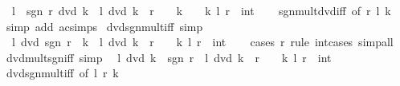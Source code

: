 \begin{isabellebody}
\ \ {\isachardoublequoteopen}l\ {\isacharasterisk}{\kern0pt}\ sgn\ r\ dvd\ k\ {\isasymlongleftrightarrow}\ l\ dvd\ k\ {\isasymand}\ {\isacharparenleft}{\kern0pt}r\ {\isacharequal}{\kern0pt}\ {}\ {\isasymlongrightarrow}\ k\ {\isacharequal}{\kern0pt}\ {}{\isacharparenright}{\kern0pt}{\isachardoublequoteclose}\ \ k\ l\ r\ {\isacharcolon}{\kern0pt}{\isacharcolon}{\kern0pt}\ int\isanewline
%
\isadelimproof
\ \ %
\endisadelimproof
%
\isatagproof
{}\isamarkupfalse%
\ sgn{\isacharunderscore}{\kern0pt}mult{\isacharunderscore}{\kern0pt}dvd{\isacharunderscore}{\kern0pt}iff\ {\isacharbrackleft}{\kern0pt}of\ r\ l\ k{\isacharbrackright}{\kern0pt}\ \isamarkupfalse%
\ {\isacharparenleft}{\kern0pt}simp\ add{\isacharcolon}{\kern0pt}\ ac{\isacharunderscore}{\kern0pt}simps{\isacharparenright}{\kern0pt}%
\endisatagproof
{\isafoldproof}%
%
\isadelimproof
\isanewline
%
\endisadelimproof
\isanewline
{}\isamarkupfalse%
\ dvd{\isacharunderscore}{\kern0pt}sgn{\isacharunderscore}{\kern0pt}mult{\isacharunderscore}{\kern0pt}iff\ {\isacharbrackleft}{\kern0pt}simp{\isacharbrackright}{\kern0pt}{\isacharcolon}{\kern0pt}\isanewline
\ \ {\isachardoublequoteopen}l\ dvd\ sgn\ r\ {\isacharasterisk}{\kern0pt}\ k\ {\isasymlongleftrightarrow}\ l\ dvd\ k\ {\isasymor}\ r\ {\isacharequal}{\kern0pt}\ {}{\isachardoublequoteclose}\ \ k\ l\ r\ {\isacharcolon}{\kern0pt}{\isacharcolon}{\kern0pt}\ int\isanewline
%
\isadelimproof
\ \ %
\endisadelimproof
%
\isatagproof
{}\isamarkupfalse%
\ {\isacharparenleft}{\kern0pt}cases\ r\ rule{\isacharcolon}{\kern0pt}\ int{\isacharunderscore}{\kern0pt}cases{}{\isacharparenright}{\kern0pt}\ simp{\isacharunderscore}{\kern0pt}all%
\endisatagproof
{\isafoldproof}%
%
\isadelimproof
\isanewline
%
\endisadelimproof
\isanewline
{}\isamarkupfalse%
\ dvd{\isacharunderscore}{\kern0pt}mult{\isacharunderscore}{\kern0pt}sgn{\isacharunderscore}{\kern0pt}iff\ {\isacharbrackleft}{\kern0pt}simp{\isacharbrackright}{\kern0pt}{\isacharcolon}{\kern0pt}\isanewline
\ \ {\isachardoublequoteopen}l\ dvd\ k\ {\isacharasterisk}{\kern0pt}\ sgn\ r\ {\isasymlongleftrightarrow}\ l\ dvd\ k\ {\isasymor}\ r\ {\isacharequal}{\kern0pt}\ {}{\isachardoublequoteclose}\ \ k\ l\ r\ {\isacharcolon}{\kern0pt}{\isacharcolon}{\kern0pt}\ int\isanewline
%
\isadelimproof
\ \ %
\endisadelimproof
%
\isatagproof
{}\isamarkupfalse%
\ dvd{\isacharunderscore}{\kern0pt}sgn{\isacharunderscore}{\kern0pt}mult{\isacharunderscore}{\kern0pt}iff\ {\isacharbrackleft}{\kern0pt}of\ l\ r\ k{\isacharbrackright}{\kern0pt}\ \isamarkupfalse%

\end{isabellebody}
